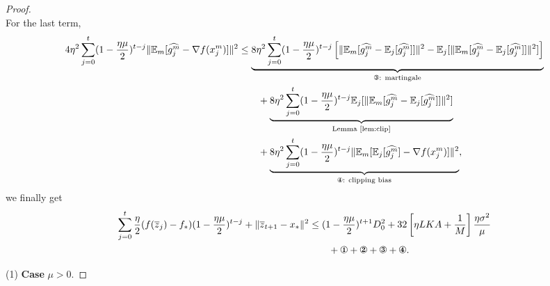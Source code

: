 \documentclass{article} %
\numberwithin{equation}{section}
\newcommand{\cirone}{\text{\ding{172}}}
\newcommand{\cirtwo}{\text{\ding{173}}}
\newcommand{\cirthree}{\text{\ding{174}}}
\newcommand{\cirfour}{\text{\ding{175}}}
\begin{document}
\begin{proof}
\begin{equation}
    \end{equation}
    For the last term,
    \begin{equation}
        \begin{aligned}
            4\eta^2\sum_{j=0}^t(1-\frac{\eta\mu}{2})^{t-j}\|\expect_m [\widehat{g_j^m}-\nabla f(x_j^m)]\|^2
            &\leq \underbrace{8\eta^2\sum_{j=0}^t(1-\frac{\eta\mu}{2})^{t-j}\left[\|\expect_m [\widehat{g_j^m}-\expect_j[\widehat{g_j^m}]]\|^2-\expect_j[\|\expect_m [\widehat{g_j^m}-\expect_j[\widehat{g_j^m}]]\|^2] \right]}_{\cirthree\text{: martingale}} \\
            &\qquad + \underbrace{8\eta^2\sum_{j=0}^t(1-\frac{\eta\mu}{2})^{t-j}\expect_j[\|\expect_m [\widehat{g_j^m}-\expect_j[\widehat{g_j^m}]]\|^2]}_{\text{Lemma \ref{lem:clip}}} \\
            &\qquad + \underbrace{8\eta^2\sum_{j=0}^t(1-\frac{\eta\mu}{2})^{t-j}\|\expect_m [\expect_j[\widehat{g_j^m}]-\nabla f(x_j^m)]\|^2}_{\cirfour\text{: clipping bias}},
        \end{aligned}
    \end{equation}
    we finally get 
    \begin{equation}\label{eq:descent_sgdm}
        \begin{aligned}
            \sum_{j=0}^t\frac{\eta}{2}(f(\overline{z}_j)-f_*)(1-\frac{\eta\mu}{2})^{t-j}+\|\overline{z}_{t+1}-x_*\|^2
            &\leq (1-\frac{\eta\mu}{2})^{t+1}D_0^2 + 32\left[\eta LKA+\frac{1}{M}\right]\frac{\eta\sigma^2}{\mu} \\
            &\qquad + \cirone+\cirtwo+\cirthree+\cirfour.
        \end{aligned}
    \end{equation}

    (1) \textbf{Case} $\mu>0$.
    

\end{proof}
\end{document}
